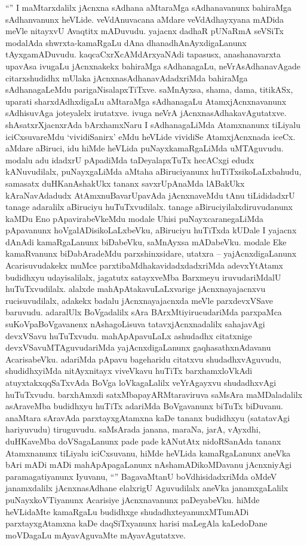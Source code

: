 
\begin{artha}
``\stext'' I maMtarxdalilx jAcnxna sAdhana aMtaraMga sAdhanavanunx bahiraMga sAdhanvanunx heVLide. veVdAnuvacana aMdare veVdAdhayxyana mADida meVle nitayxvU Avaqtitx mADuvudu. yajacnx dadhaR pUNaRmA seVSiTx modalAda shwrxta-kamaRgaLu dAna dhanadhAnAyxdigaLanunx tAyxgamADuvudu. kaqcaCxrXcAMdArxyaNAdi tapasusx, anashanavarxta upavAsa ivugaLu jAcnxnakekx bahiraMga sAdhanagaLu, neVrAsAdhanavAgade citarxshudidhx mUlaka jAcnxnasAdhanavAdadxriMda bahiraMga sAdhanagaLeMdu parigaNisalapxTiTxve. saMnAyxsa, shama, dama, titikASx, uparati sharxdAdhxdigaLu aMtaraMga sAdhanagaLu AtamxjAcnxnavanunx sAdhisuvAga joteyalelx irutatxve. ivuga neVrA jAcnxnasAdhakavAgutatxve. shAsatxrXjacnxrAda bArxhamxNaru I sAdhanagaLiMda Atamxnanunx tiLiyalu iciCxsuvareMdu `vividiSanirx' eMdu heVLide vividiSe AtamxjAcnxnada iceCx. aMdare aBiruci, idu hiMde heVLida puNayxkamaRgaLiMda uMTAguvudu. modalu adu idadxrU pApadiMda taDeyalapxTuTx hecACxgi edudx kANuvudilalx, puNayxgaLiMda aMtaha aBiruciyanunx huTiTxsikoLaLxbahudu, samasatx duHKanAshakUkx tananx savxrUpAnaMda lABakUkx kAraNavAdadudx AtAmxnuBavarUpavAda jAcnxnaveMdu tAnu tiLididadxrU tanage adaralilx aBiruciyu huTuTxvudilalx. tanage aBiruciyilalxdiruvudanunx kaMDu Eno pApavirabeVkeMdu modale Uhisi puNayxcaranegaLiMda pApavanunx hoVgalADisikoLaLxbeVku, aBiruciyu huTiTxda kUDale I yajacnx dAnAdi kamaRgaLanunx biDabeVku, saMnAyxsa mADabeVku. modale Eke kamaRvanunx biDabAradeMdu parxshinxsidare, utatxra -- yajAcnxdigaLanunx Acarisuvudakekx muMce parxtibaMdhakavidadxdadxriMda adevxYtAtamx budidhxyu udayisalilalx, jagatutx satayxveMba Barxmeyu iruvudariMdalU huTuTxvudilalx. alalxde mahApAtakavuLaLxvarige jAcnxnayajacnxvu rucisuvudilalx, adakekx badalu jAcnxnayajacnxda meVle parxdevxVSave baruvudu. adaralUlx BoVgadalilx sAra BArxMtiyirucudariMda parxpaMca suKoVpaBoVgavanenx nAshagoLisuva tatavxjAcnxnadalilx sahajavAgi devxVSavu huTuTxvudu. mahApApavuLaLx ashudadhx citatxnige devxVSavuMTAguvudariMda yajAcnxdigaLanunx gaqhasathxnAdavanu AcarisabeVku. adariMda pApavu bageharidu citatxvu shudadhxvAguvudu, shudidhxyiMda nitAyxnitayx viveVkavu huTiTx barxhamxloVkAdi atuyxtakxqqSaTxvAda BoVga loVkagaLalilx veYrAgayxvu shudadhxvAgi huTuTxvudu. barxhAmxdi satxMbapayARMtaraviruva saMsAra maMDaladalilx asAraveMba budidhxyu huTiTx adariMda BoVgavanunx biTuTx biDuvanu. anaMtara sAravAda parxtayxgAtamxna kaDe tananx budidhxyu (satatavAgi hariyuvudu) tiruguvudu. saMsArada janana, maraNa, jarA, vAyxdhi, duHKaveMba doVSagaLanunx pade pade kANutAtx nidoRSanAda tananx Atamxnanunx tiLiyalu iciCxsuvanu, hiMde heVLida kamaRgaLanunx aneVka bAri mADi mADi mahApApagaLanunx nAshamADikoMDavanu jAcnxniyAgi paramagatiyanunx Iyuvanu, ``\stext'' BagavaMtanU boVdhisidadxriMda oMdeV janamxdalilx jAcnxnasAdhane elalxrigU Aguvudilalx aneVka janamxgaLalilx puNayxkoVTiyanunx Acarisiye jAcnxnavanunx paDeyabeVku. hiMde heVLidaMte kamaRgaLu budidhxge shudadhxteyanunxMTumADi parxtayxgAtamxna kaDe daqSiTxyanunx harisi maLegAla kaLedoDane moVDagaLu mAyavAguvaMte mAyavAgutatxve.
\end{artha}

